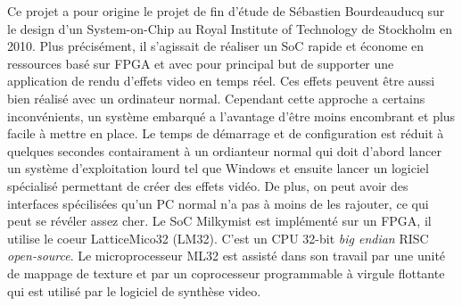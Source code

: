 \vspace{15px}

Ce projet a pour origine le projet de fin d'étude de Sébastien Bourdeauducq sur le design d'un System-on-Chip au Royal Institute of Technology de Stockholm en 2010. Plus précisément, il s'agissait de réaliser un SoC rapide et économe en ressources basé sur FPGA et avec pour principal but de supporter une application de rendu d'effets video en temps réel. Ces effets peuvent être aussi bien réalisé avec un ordinateur normal. Cependant cette approche a certains inconvénients, un système embarqué a l'avantage d'être moins encombrant et plus facile à mettre en place. Le temps de démarrage et de configuration est réduit à  quelques secondes contairament à un ordianteur normal qui doit d'abord lancer un système d'exploitation lourd tel que Windows et ensuite lancer un logiciel spécialisé permettant de créer des effets vidéo. De plus, on peut avoir des interfaces spécilisées qu'un PC normal n'a pas à moins de les rajouter, ce qui peut se révéler assez cher.
Le SoC Milkymist est implémenté sur un FPGA, il utilise le coeur LatticeMico32 (LM32). C'est un CPU 32-bit \textit{big endian} RISC \textit{open-source}. Le microprocesseur ML32 est assisté dans son travail par une unité de mappage de texture et par un coprocesseur programmable à virgule flottante qui est utilisé par le logiciel de synthèse video.
\medskip
